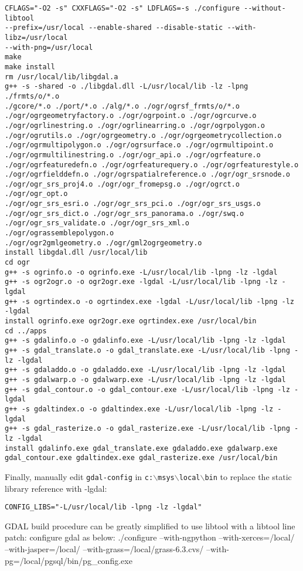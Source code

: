 \begin{verbatim}
CFLAGS="-O2 -s" CXXFLAGS="-O2 -s" LDFLAGS=-s ./configure --without-libtool 
--prefix=/usr/local --enable-shared --disable-static --with-libz=/usr/local 
--with-png=/usr/local
make
make install
rm /usr/local/lib/libgdal.a
g++ -s -shared -o ./libgdal.dll -L/usr/local/lib -lz -lpng ./frmts/o/*.o 
./gcore/*.o ./port/*.o ./alg/*.o ./ogr/ogrsf_frmts/o/*.o 
./ogr/ogrgeometryfactory.o ./ogr/ogrpoint.o ./ogr/ogrcurve.o 
./ogr/ogrlinestring.o ./ogr/ogrlinearring.o ./ogr/ogrpolygon.o 
./ogr/ogrutils.o ./ogr/ogrgeometry.o ./ogr/ogrgeometrycollection.o 
./ogr/ogrmultipolygon.o ./ogr/ogrsurface.o ./ogr/ogrmultipoint.o 
./ogr/ogrmultilinestring.o ./ogr/ogr_api.o ./ogr/ogrfeature.o 
./ogr/ogrfeaturedefn.o ./ogr/ogrfeaturequery.o ./ogr/ogrfeaturestyle.o 
./ogr/ogrfielddefn.o ./ogr/ogrspatialreference.o ./ogr/ogr_srsnode.o 
./ogr/ogr_srs_proj4.o ./ogr/ogr_fromepsg.o ./ogr/ogrct.o ./ogr/ogr_opt.o 
./ogr/ogr_srs_esri.o ./ogr/ogr_srs_pci.o ./ogr/ogr_srs_usgs.o 
./ogr/ogr_srs_dict.o ./ogr/ogr_srs_panorama.o ./ogr/swq.o 
./ogr/ogr_srs_validate.o ./ogr/ogr_srs_xml.o ./ogr/ograssemblepolygon.o 
./ogr/ogr2gmlgeometry.o ./ogr/gml2ogrgeometry.o
install libgdal.dll /usr/local/lib
cd ogr
g++ -s ogrinfo.o -o ogrinfo.exe -L/usr/local/lib -lpng -lz -lgdal
g++ -s ogr2ogr.o -o ogr2ogr.exe -lgdal -L/usr/local/lib -lpng -lz -lgdal
g++ -s ogrtindex.o -o ogrtindex.exe -lgdal -L/usr/local/lib -lpng -lz -lgdal
install ogrinfo.exe ogr2ogr.exe ogrtindex.exe /usr/local/bin
cd ../apps
g++ -s gdalinfo.o -o gdalinfo.exe -L/usr/local/lib -lpng -lz -lgdal
g++ -s gdal_translate.o -o gdal_translate.exe -L/usr/local/lib -lpng -lz -lgdal
g++ -s gdaladdo.o -o gdaladdo.exe -L/usr/local/lib -lpng -lz -lgdal
g++ -s gdalwarp.o -o gdalwarp.exe -L/usr/local/lib -lpng -lz -lgdal
g++ -s gdal_contour.o -o gdal_contour.exe -L/usr/local/lib -lpng -lz -lgdal
g++ -s gdaltindex.o -o gdaltindex.exe -L/usr/local/lib -lpng -lz -lgdal
g++ -s gdal_rasterize.o -o gdal_rasterize.exe -L/usr/local/lib -lpng -lz -lgdal
install gdalinfo.exe gdal_translate.exe gdaladdo.exe gdalwarp.exe 
gdal_contour.exe gdaltindex.exe gdal_rasterize.exe /usr/local/bin

\end{verbatim}

Finally, manually edit \texttt{gdal-config} in \texttt{c:$\backslash$msys$\backslash$local$\backslash$bin} to replace the static library reference with -lgdal:

\begin{verbatim}
CONFIG_LIBS="-L/usr/local/lib -lpng -lz -lgdal"
\end{verbatim}
GDAL build procedure can be greatly simplified to use libtool with a libtool line patch:
configure gdal as below:
./configure --with-ngpython --with-xerces=/local/ --with-jasper=/local/ --with-grass=/local/grass-6.3.cvs/ --with-pg=/local/pgsql/bin/pg\_config.exe 


